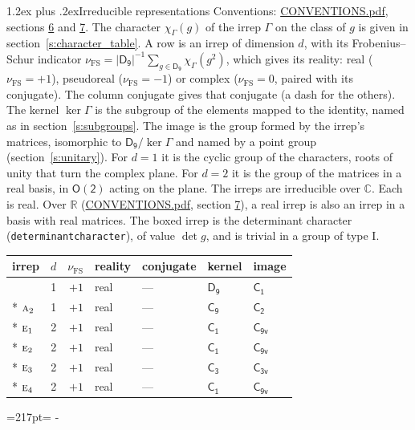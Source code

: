 \documentclass[10pt,a4paper]{article}
\makeatletter
\renewcommand\section{\@startsection{section}{1}{\z@}{-3ex plus -1ex minus -.2ex}%
  {1.2ex plus .2ex}{\normalfont\large\sffamily\bfseries\color{parttitle}}}
\newcommand{\needspace}[1]{\par\penalty-100\begingroup\dimen0=#1\relax\dimen2=\pagegoal
  \advance\dimen2-\pagetotal\ifdim\dimen0>\dimen2\relax\ifdim\dimen2>0pt\vfil\break\fi\fi
  \endgroup}
\numberwithin{equation}{section}
\newcommand{\grp}[1]{\mathsf{#1}}
\newcommand{\irr}[1]{\text{\normalfont\scshape #1}}
\newcommand{\detbox}[1]{{\setlength{\fboxsep}{1pt}\fbox{#1}}}
\newcommand{\irchar}[1]{\chi_{#1}}
\newcommand{\fsind}{\nu_{\mathrm{FS}}}
\makeatother
\begin{document}
\section{Irreducible representations}\label{s:irreps}
Conventions: \href{../../CONVENTIONS.pdf}{CONVENTIONS.pdf}, sections \href{../../CONVENTIONS.pdf\#conv.6}{6} and \href{../../CONVENTIONS.pdf\#conv.7}{7}.
\leavevmode\label{n:function.character}\label{n:irrep.Gamma}The character $\irchar{\Gamma}(g)$ of the irrep $\Gamma$ on the class of $g$ is given in section~\ref{s:character_table}.
\leavevmode\label{n:index.dimension}\label{n:index.frobenius}\label{n:head.irrep}\label{n:head.reality}A row is an irrep of dimension $d$, with its Frobenius--Schur indicator $\fsind = |\grp{D_{9}}|^{-1}\allowbreak\sum_{g\in\grp{D_{9}}}\irchar{\Gamma}(g^2)$, which gives its reality: real ($\fsind = +1$), pseudoreal ($\fsind = -1$) or complex ($\fsind = 0$, paired with its conjugate). \label{n:head.conjugate}The column conjugate gives that conjugate (a dash for the others). \label{n:head.kernel}The kernel $\ker\Gamma$ is the subgroup of the elements mapped to the identity, named as in section~\ref{s:subgroups}. \label{n:head.image}The image is the group formed by the irrep's matrices, isomorphic to $\grp{D_{9}}/\ker\Gamma$ and named by a point group (section~\ref{s:unitary}). For $d = 1$ it is the cyclic group of the characters, roots of unity that turn the complex plane. For $d = 2$ it is the group of the matrices in a real basis, in $\grp{O(2)}$ acting on the plane. The irreps are irreducible over $\mathbb{C}$. Each is real. Over $\mathbb{R}$ (\href{../../CONVENTIONS.pdf}{CONVENTIONS.pdf}, section \href{../../CONVENTIONS.pdf\#conv.7}{7}), a real irrep is also an irrep in a basis with real matrices. \label{n:mark.determinant}The boxed irrep is the determinant character (\texttt{determinantcharacter}), of value $\det g$, and is trivial in a group of type I.
\setlength{\emergencystretch}{2em}\par\setlength{\emergencystretch}{0pt}
{\small\renewcommand{\arraystretch}{1.25}\begin{longtable}{@{}lrrllll@{}}\toprule
irrep & $d$ & $\fsind$ & reality & conjugate & kernel & image\\\midrule\endhead
\bottomrule\endfoot\endlastfoot
\detbox{$\irr{a}_{1}$} & 1 & $+1$ & real & --- & \href{D9.pdf}{$\grp{D_{9}}$} & \href{C1.pdf}{$\grp{C_{1}}$}\\*
$\irr{a}_{2}$ & 1 & $+1$ & real & --- & \href{C9.pdf}{$\grp{C_{9}}$} & \href{C2.pdf}{$\grp{C_{2}}$}\\*
$\irr{e}_{1}$ & 2 & $+1$ & real & --- & \href{C1.pdf}{$\grp{C_{1}}$} & \href{C9v.pdf}{$\grp{C_{9v}}$}\\*
$\irr{e}_{2}$ & 2 & $+1$ & real & --- & \href{C1.pdf}{$\grp{C_{1}}$} & \href{C9v.pdf}{$\grp{C_{9v}}$}\\*
$\irr{e}_{3}$ & 2 & $+1$ & real & --- & \href{C3.pdf}{$\grp{C_{3}}$} & \href{C3v.pdf}{$\grp{C_{3v}}$}\\*
$\irr{e}_{4}$ & 2 & $+1$ & real & --- & \href{C1.pdf}{$\grp{C_{1}}$} & \href{C9v.pdf}{$\grp{C_{9v}}$}\\
\bottomrule\end{longtable}}
\needspace{217pt}
\end{document}
